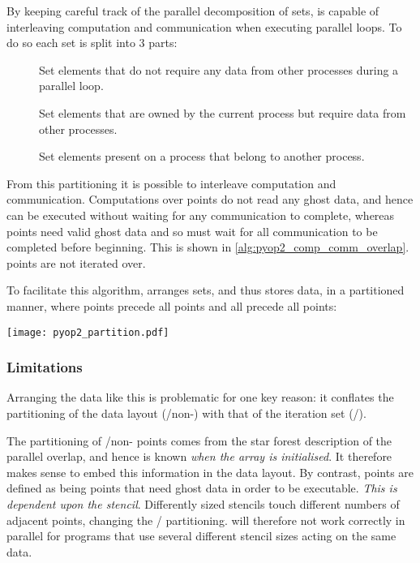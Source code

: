 \documentclass[thesis]{subfiles}
\begin{document}
By keeping careful track of the parallel decomposition of sets,  is capable of interleaving computation and communication when executing parallel loops.
To do so each set is split into 3 parts:
\begin{description}
  \item[\coreiter{}]
    Set elements that do not require any data from other processes during a parallel loop.
  \item[\ownediter{}]
    Set elements that are owned by the current process but require data from other processes.
  \item[\ghostiter{}]
    Set elements present on a process that belong to another process.
\end{description}
From this partitioning it is possible to interleave computation and communication.
Computations over \coreiter{} points do not read any ghost data, and hence can be executed without waiting for any communication to complete, whereas \ownediter{} points need valid ghost data and so must wait for all communication to be completed before beginning.
This is shown in \cref{alg:pyop2_comp_comm_overlap}.
\ghostiter{} points are not iterated over.

To facilitate this algorithm,  arranges sets, and thus stores data, in a partitioned manner, where \coreiter{} points precede all \ownediter{} points and all \ownediter{} precede all \ghostiter{} points:
\begin{center}
  \texttt{[image: pyop2\_partition.pdf]}
\end{center}

\subsubsection{Limitations}
\label{sec:pyop2_parallel_limitation}

Arranging the data like this is problematic for one key reason: it conflates the partitioning of the data layout (\ghostiter{}/non-\ghostiter{}) with that of the iteration set (\coreiter{}/\ownediter{}).

The partitioning of \ghostiter{}/non-\ghostiter{} points comes from the star forest description of the parallel overlap, and hence is known \emph{when the array is initialised}.
It therefore makes sense to embed this information in the data layout.
By contrast, \ownediter{} points are defined as being points that need ghost data in order to be executable.
\emph{This is dependent upon the stencil}.
Differently sized stencils touch different numbers of adjacent points, changing the \coreiter{}/\ownediter{} partitioning.
 will therefore not work correctly in parallel for programs that use several different stencil sizes acting on the same data.
\end{document}
